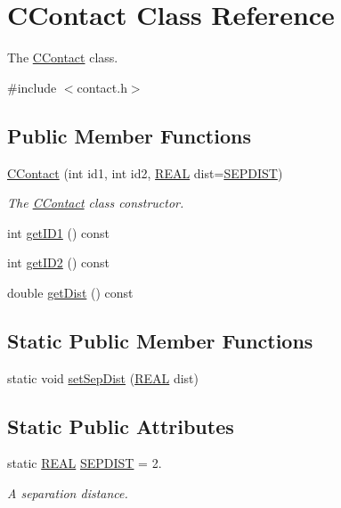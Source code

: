 \hypertarget{classCContact}{\section{C\-Contact Class Reference}
\label{classCContact}
}


The \hyperlink{classCContact}{C\-Contact} class.  




{\ttfamily \#include $<$contact.\-h$>$}

\subsection*{Public Member Functions}
\begin{DoxyCompactItemize}
\item 
\hyperlink{classCContact_a2e2b9fcbde1245b12dfbf5c525f2e2f2}{C\-Contact} (int id1, int id2, \hyperlink{util_8h_a5821460e95a0800cf9f24c38915cbbde}{R\-E\-A\-L} dist=\hyperlink{classCContact_ad644f8a39a8f8778cac26a8c7a56e7fa}{S\-E\-P\-D\-I\-S\-T})
\begin{DoxyCompactList}\small\item\em The \hyperlink{classCContact}{C\-Contact} class constructor. \end{DoxyCompactList}\item 
int \hyperlink{classCContact_a8e28fd0d482ba1aadff37f41895e1027}{get\-I\-D1} () const 
\item 
int \hyperlink{classCContact_a7120e6624807063f3a4a40b2dd3228cf}{get\-I\-D2} () const 
\item 
double \hyperlink{classCContact_a78ffd6a0dff43ba55c25aa05a9258302}{get\-Dist} () const 
\end{DoxyCompactItemize}
\subsection*{Static Public Member Functions}
\begin{DoxyCompactItemize}
\item 
static void \hyperlink{classCContact_a868386a669900e33db303fa530b4fe65}{set\-Sep\-Dist} (\hyperlink{util_8h_a5821460e95a0800cf9f24c38915cbbde}{R\-E\-A\-L} dist)
\end{DoxyCompactItemize}
\subsection*{Static Public Attributes}
\begin{DoxyCompactItemize}
\item 
static \hyperlink{util_8h_a5821460e95a0800cf9f24c38915cbbde}{R\-E\-A\-L} \hyperlink{classCContact_ad644f8a39a8f8778cac26a8c7a56e7fa}{S\-E\-P\-D\-I\-S\-T} = 2.
\begin{DoxyCompactList}\small\item\em A separation distance. \end{DoxyCompactList}\end{DoxyCompactItemize}


